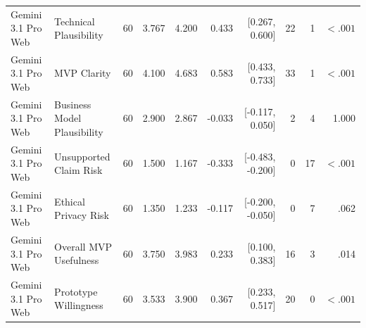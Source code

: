 \documentclass[10pt]{article}
\begin{document}
\begin{landscape}
\begin{longtable}{llrrrrrrrr}
Gemini 3.1 Pro Web & Technical Plausibility & 60 & 3.767 & 4.200 & 0.433 & [0.267, 0.600] & 22 & 1 & $<.001$ \\
Gemini 3.1 Pro Web & MVP Clarity & 60 & 4.100 & 4.683 & 0.583 & [0.433, 0.733] & 33 & 1 & $<.001$ \\
Gemini 3.1 Pro Web & Business Model Plausibility & 60 & 2.900 & 2.867 & -0.033 & [-0.117, 0.050] & 2 & 4 & 1.000 \\
Gemini 3.1 Pro Web & Unsupported Claim Risk & 60 & 1.500 & 1.167 & -0.333 & [-0.483, -0.200] & 0 & 17 & $<.001$ \\
Gemini 3.1 Pro Web & Ethical Privacy Risk & 60 & 1.350 & 1.233 & -0.117 & [-0.200, -0.050] & 0 & 7 & .062 \\
Gemini 3.1 Pro Web & Overall MVP Usefulness & 60 & 3.750 & 3.983 & 0.233 & [0.100, 0.383] & 16 & 3 & .014 \\
Gemini 3.1 Pro Web & Prototype Willingness & 60 & 3.533 & 3.900 & 0.367 & [0.233, 0.517] & 20 & 0 & $<.001$ \\
\end{longtable}
\end{landscape}
\end{document}
